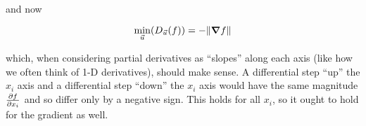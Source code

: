 \documentclass[../main/main.tex]{subfiles}
\begin{document}
and now

\[
  \min_{\vec{u}}(D_{\vec{u}}(f)) 
  = -\norm{\grad{f}}
\]

which, when considering partial derivatives as ``slopes''
along each axis (like how we often think of 1-D derivatives),
should make sense.
A differential step ``up'' the \(x_i\) axis 
and a differential step ``down'' the \(x_i\) axis
would have the same magnitude \(\pdv{f}{x_i}\) and so differ
only by a negative sign.
This holds for all \(x_i\), so it ought to hold
for the gradient as well.








\end{document}
